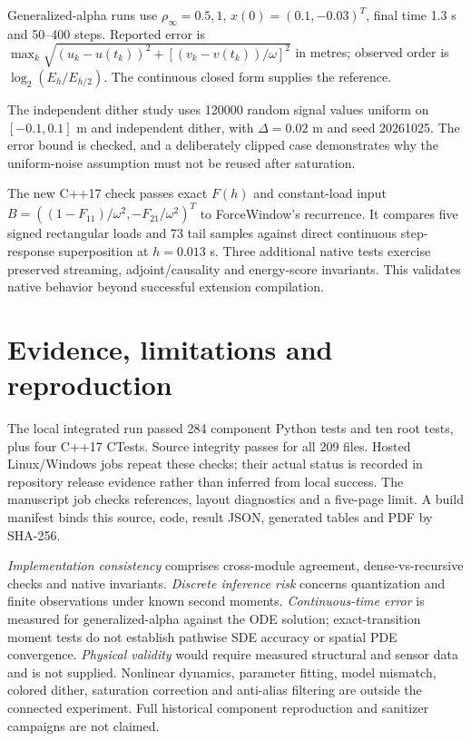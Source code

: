 \documentclass[10pt,a4paper]{article}
\begin{document}
Generalized-alpha runs use $\rho_\infty=0.5,1$, $x(0)=(0.1,-0.03)^T$, final time 1.3 s and 50--400 steps. Reported error is $\max_k\sqrt{(u_k-u(t_k))^2+[(v_k-v(t_k))/\omega]^2}$ in metres; observed order is $\log_2(E_h/E_{h/2})$. The continuous closed form supplies the reference.

The independent dither study uses 120000 random signal values uniform on $[-0.1,0.1]$ m and independent dither, with $\Delta=0.02$ m and seed 20261025. The error bound is checked, and a deliberately clipped case demonstrates why the uniform-noise assumption must not be reused after saturation.

The new C++17 check passes exact $F(h)$ and constant-load input $B=((1-F_{11})/\omega^2,-F_{21}/\omega^2)^T$ to ForceWindow's recurrence. It compares five signed rectangular loads and 73 tail samples against direct continuous step-response superposition at $h=0.013$ s. Three additional native tests exercise preserved streaming, adjoint/causality and energy-score invariants. This validates native behavior beyond successful extension compilation.
\section{Evidence, limitations and reproduction}
The local integrated run passed 284 component Python tests and ten root tests, plus four C++17 CTests. Source integrity passes for all 209 files. Hosted Linux/Windows jobs repeat these checks; their actual status is recorded in repository release evidence rather than inferred from local success. The manuscript job checks references, layout diagnostics and a five-page limit. A build manifest binds this source, code, result JSON, generated tables and PDF by SHA-256.

\emph{Implementation consistency} comprises cross-module agreement, dense-vs-recursive checks and native invariants. \emph{Discrete inference risk} concerns quantization and finite observations under known second moments. \emph{Continuous-time error} is measured for generalized-alpha against the ODE solution; exact-transition moment tests do not establish pathwise SDE accuracy or spatial PDE convergence. \emph{Physical validity} would require measured structural and sensor data and is not supplied. Nonlinear dynamics, parameter fitting, model mismatch, colored dither, saturation correction and anti-alias filtering are outside the connected experiment. Full historical component reproduction and sanitizer campaigns are not claimed.
\end{document}
